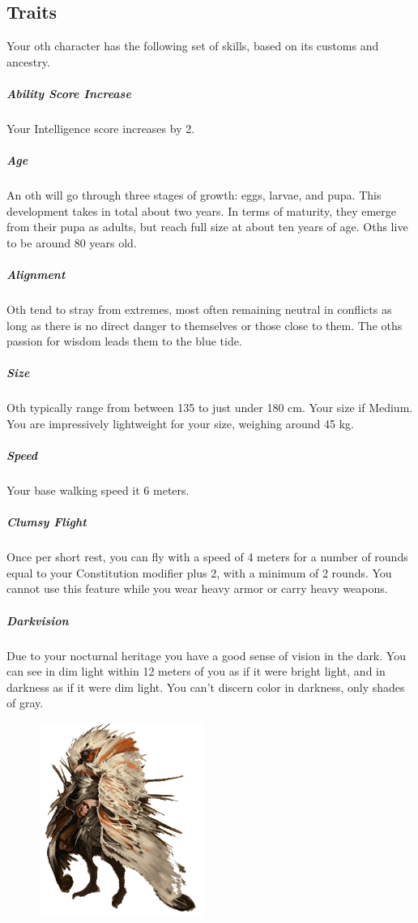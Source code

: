 \subsection*{Traits}
    Your oth character has the following set of skills, based on its customs and ancestry.

    \subparagraph{Ability Score Increase} Your Intelligence score increases by 2.

    \subparagraph{Age} An oth will go through three stages of growth: eggs, larvae, and pupa.
    This development takes in total about two years.
    In terms of maturity, they emerge from their pupa as adults, but reach full size at about ten years of age.
    Oths live to be around 80 years old.

    \subparagraph{Alignment} Oth tend to stray from extremes, most often remaining neutral in conflicts as long as there is no direct danger to themselves or those close to them.
    The oths passion for wisdom leads them to the blue tide.

    \subparagraph{Size} Oth typically range from between 135 to just under 180 cm.
    Your size if Medium.
    You are impressively lightweight for your size, weighing around 45 kg.

    \subparagraph{Speed} Your base walking speed it 6 meters.

    \subparagraph{Clumsy Flight} Once per short rest, you can fly with a speed of 4 meters for a number of rounds equal to your Constitution modifier plus 2, with a minimum of 2 rounds.
    You cannot use this feature while you wear heavy armor or carry heavy weapons.

    \subparagraph{Darkvision} Due to your nocturnal heritage you have a good sense of vision in the dark.
    You can see in dim light within 12 meters of you as if it were bright light, and in darkness as if it were dim light.
    You can't discern color in darkness, only shades of gray.

\begin{figure}[!t]
    \centering
    \includegraphics[width=0.48\textwidth]{04kins/img/14oth_white.png}
\end{figure}

